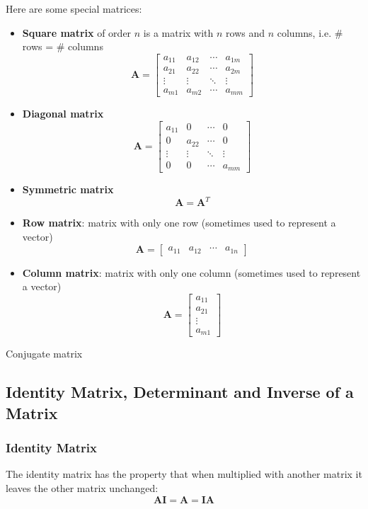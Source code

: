 Here are some special matrices:
\begin{itemize}
\item \textbf{Square matrix} of order $n$ is a matrix with $n$ rows and $n$ columns, i.e. \# rows = \# columns
\[ \mathbf{A} = \begin{bmatrix}
    a_{11} & a_{12} & \cdots & a_{1m} \\
    a_{21} & a_{22} & \cdots & a_{2m} \\
    \vdots & \vdots & \ddots & \vdots \\
    a_{m1} & a_{m2} & \cdots & a_{mm}
\end{bmatrix} \]

\item \textbf{Diagonal matrix}
\[ \mathbf{A} = \begin{bmatrix}
    a_{11} & 0 & \cdots & 0 \\
    0 & a_{22} & \cdots & 0 \\
    \vdots & \vdots & \ddots & \vdots \\
    0 & 0 & \cdots & a_{mm}
\end{bmatrix} \]

\item \textbf{Symmetric matrix}
\[ \mathbf{A} = \mathbf{A}^T \]

\item \textbf{Row matrix}: matrix with only one row (sometimes used to represent a vector)
\[ \mathbf{A} = 
\begin{bmatrix}
    a_{11} & a_{12} & \cdots & a_{1n}
\end{bmatrix} \]

\item \textbf{Column matrix}:  matrix with only one column (sometimes used to represent a vector)
\[ \mathbf{A} = 
\begin{bmatrix}
    a_{11} \\
    a_{21} \\
    \vdots \\
    a_{m1}
\end{bmatrix} \]
\end{itemize}

Conjugate matrix

\subsection{Identity Matrix, Determinant and Inverse of a Matrix}
\subsubsection{Identity Matrix}
The identity matrix has the property that when multiplied with another matrix it leaves the other matrix unchanged:
\begin{equation}
\mathbf{AI} = \mathbf{A} = \mathbf{IA}
\end{equation}

